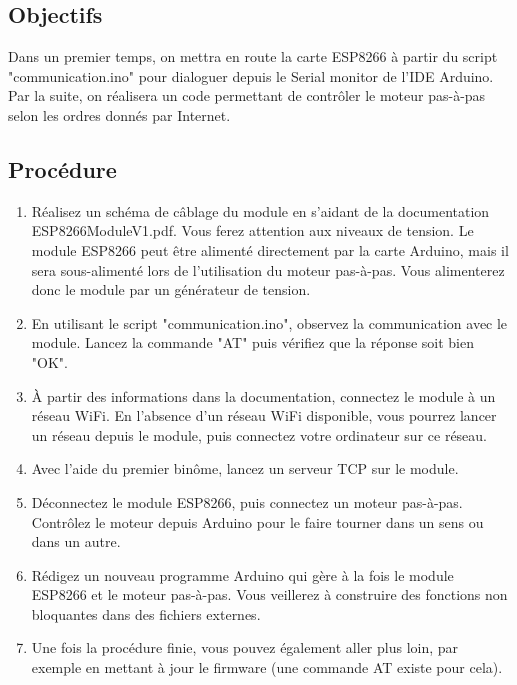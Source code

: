 \documentclass[abstracton]{scrartcl}
\newcommand*{\rootPath}{./}
\begin{document}
\subsection{Objectifs}

Dans un premier temps, on mettra en route la carte ESP8266 à partir du script "communication.ino" pour dialoguer depuis le Serial monitor de l'IDE Arduino.
Par la suite, on réalisera un code permettant de contrôler le moteur pas-à-pas selon les ordres donnés par Internet.


\subsection{Procédure}

\begin{enumerate}
    \item Réalisez un schéma de câblage du module en s'aidant de la documentation ESP8266ModuleV1.pdf. Vous ferez attention aux niveaux de tension. Le module ESP8266 peut être alimenté directement par la carte Arduino, mais il sera sous-alimenté lors de l'utilisation du moteur pas-à-pas. Vous alimenterez donc le module par un générateur de tension.
    \item En utilisant le script "communication.ino", observez la communication avec le module. Lancez la commande "AT" puis vérifiez que la réponse soit bien "OK".
    \item À partir des informations dans la documentation, connectez le module à un réseau WiFi. En l'absence d'un réseau WiFi disponible, vous pourrez lancer un réseau depuis le module, puis connectez votre ordinateur sur ce réseau.
    \item Avec l'aide du premier binôme, lancez un serveur TCP sur le module.
    \item Déconnectez le module ESP8266, puis connectez un moteur pas-à-pas. Contrôlez le moteur depuis Arduino pour le faire tourner dans un sens ou dans un autre.
    \item Rédigez un nouveau programme Arduino qui gère à la fois le module ESP8266 et le moteur pas-à-pas. Vous veillerez à construire des fonctions non bloquantes dans des fichiers externes.
    \item Une fois la procédure finie, vous pouvez également aller plus loin, par exemple en mettant à jour le firmware (une commande AT existe pour cela).
\end{enumerate}


\ifstandalone

    \appendix
	
	
\fi
\end{document}
